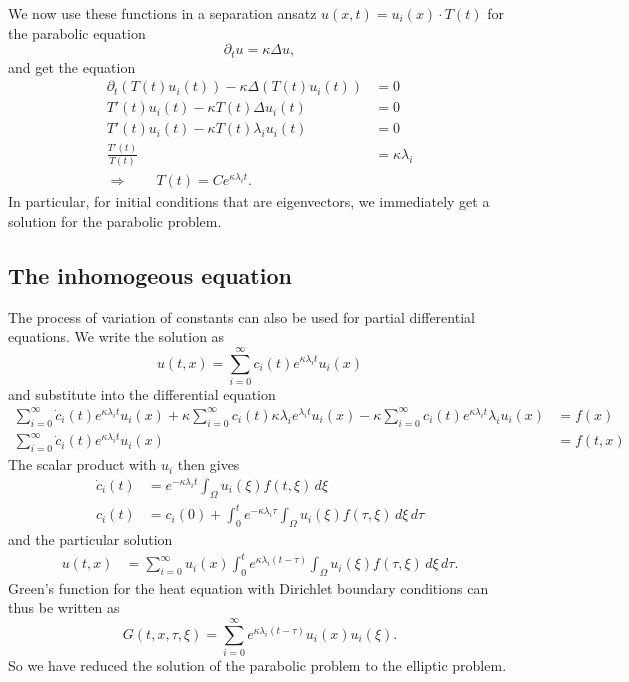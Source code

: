 We now use these functions in a separation ansatz
$u(x,t)=u_i(x)\cdot T(t)$ for the parabolic equation
\[
\partial_tu=\kappa\Delta u,
\]
and get the equation
\begin{align*}
\partial_t (T(t)u_i(t))-\kappa\Delta(T(t)u_i(t))&=0
\\
T'(t)u_i(t)-\kappa T(t)\Delta u_i(t)&=0
\\
T'(t)u_i(t)-\kappa T(t)\lambda_i u_i(t)&=0
\\
\frac{T'(t)}{T(t)}&=\kappa\lambda_i
\\
\Rightarrow\qquad T(t)=Ce^{\kappa\lambda_it}.
\end{align*}
In particular, for initial conditions that are eigenvectors, we
immediately get a solution for the parabolic problem.

\subsection{The inhomogeous equation}
The process of variation of constants can also be used for partial
differential equations.
We write the solution as
\[
u(t,x)=\sum_{i=0}^\infty c_i(t) e^{\kappa\lambda_i t}u_i(x)
\]
and substitute into the differential equation
\begin{align*}
\sum_{i=0}^\infty \dot c_i(t)e^{\kappa\lambda_it}u_i(x)
+\kappa\sum_{i=0}^\infty c_i(t)\kappa\lambda_i e^{\lambda_it}u_i(x)
-\kappa\sum_{i=0}^\infty c_i(t)e^{\kappa\lambda_it}\lambda_iu_i(x)
&=f(x)
\\
\sum_{i=0}^\infty \dot c_i(t)e^{\kappa\lambda_it}u_i(x)
&=f(t,x)
\end{align*}
The scalar product with $u_i$ then gives
\begin{align*}
\dot c_i(t)&= e^{-\kappa\lambda_it}\int_{\Omega}u_i(\xi)f(t,\xi)\,d\xi
\\
c_i(t)&=c_i(0)+\int_0^te^{-\kappa\lambda_i\tau}\int_{\Omega}u_i(\xi)f(\tau,\xi)\,d\xi\,d\tau
\end{align*}
and the particular solution
\begin{align*}
u(t,x)&=
\sum_{i=0}^\infty
u_i(x)
\int_0^t
e^{\kappa\lambda_i(t-\tau)}\int_{\Omega}u_i(\xi)f(\tau,\xi)\,d\xi\,d\tau.
\end{align*}
Green's function for the heat equation with Dirichlet boundary conditions
can thus be written as
\[
G(t,x,\tau,\xi)
=
\sum_{i=0}^\infty
e^{\kappa\lambda_i (t-\tau)}
u_i(x)
u_i(\xi).
\]
So we have reduced the solution of the parabolic problem to the
elliptic problem.

